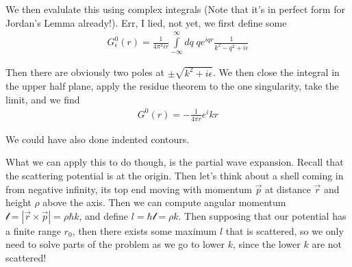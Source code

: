 \documentclass[10pt]{report}
\newcommand{\abs}[1]{\left|#1\right|}
\begin{document}
We then evalulate this using complex integrals (Note that it's in perfect form for Jordan's Lemma already!). Err, I lied, not yet, we first define some
\begin{align}
    G^0_\epsilon(r) = \frac{1}{4\pi^2 ir}\displaystyle\int\limits_{-\infty}^{\infty}dq\;qe^{iqr}\frac{1}{k^2 - q^2 + i\epsilon}
\end{align}

Then there are obviously two poles at $\pm \sqrt{k^2 + i\epsilon}$. We then close the integral in the upper half plane, apply the residue theorem to the one singularity, take the limit, and we find
\begin{align}
    G^0(r)= -\frac{1}{4\pi r}e^ikr
\end{align}

We could have also done indented contours.

What we can apply this to do though, is the partial wave expansion. Recall that the scattering potential is at the origin. Then let's think about a shell coming in from negative infinity, its top end moving with momentum $\vec{p}$ at distance $\vec{r}$ and height $\rho$ above the axis. Then we can compute angular momentum $\mathcal{l} = \abs{\vec{r}\times \vec{p}} = \rho\hbar k$, and define $l = \hbar \mathcal{l} = \rho k$. Then supposing that our potential has a finite range $r_0$, then there exists some maximum $l$ that is scattered, so we only need to solve parts of the problem as we go to lower $k$, since the lower $k$ are not scattered!
\end{document}
